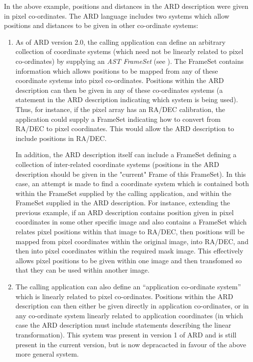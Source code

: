 In the above example, positions and distances in the ARD description were given
in pixel co-ordinates. The ARD language includes two systems which allow 
positions and distances to be given in other co-ordinate systems:
\begin{enumerate}

\item As of ARD version 2.0, the calling application can define an
arbitrary collection of coordinate systems (which need not be linearly
related to pixel co-ordinates) by supplying an {\em AST FrameSet} (see 
). The FrameSet contains information which allows
positions to be mapped from any of these coordinate systems into pixel
co-ordinates. Positions within the ARD description can then be given 
in any of these co-ordinates systems (a statement in the ARD description
indicating which system is being used). Thus, for instance, if the pixel
array has an RA/DEC calibration, the application could supply a FrameSet
indicating how to convert from RA/DEC to pixel coordinates. This would
allow the ARD description to include positions in RA/DEC.

In addition, the ARD description itself can include a FrameSet defining
a collection of inter-related coordinate systems (positions in the ARD
description should be given in the "current" Frame of this FrameSet). In
this case, an attempt is made to find a coordinate system which is
contained both within the FrameSet supplied by the calling application,
and within the FrameSet supplied in the ARD description. For instance,
extending the previous example, if an ARD description contains position 
given in pixel coordinates in some other specific image and also contains a 
FrameSet which relates pixel positions within that image to RA/DEC, then 
positions will be mapped from pixel coordinates within the original
image, into RA/DEC, and then into pixel coordinates within the required
mask image. This effectively allows pixel positions to be given within
one image and then transfomed so that they can be used within another 
image.

\item The calling application can also define an ``application co-ordinate 
system'' which is linearly related to pixel co-ordinates. Positions within the 
ARD description can then either be given directly in application co-ordinates, 
or in any co-ordinate system linearly related to application coordinates
(in which case the ARD description must include statements describing the
linear transformation). This system was present in version 1 of ARD and
is still present in the current version, but is now depracacted in favour
of the above more general system.

\end{enumerate}

